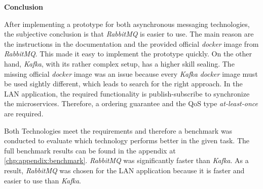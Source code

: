 \textbf{Conclusion}

After implementing a prototype for both asynchronous messaging technologies, the subjective conclusion is that \textit{RabbitMQ} is easier to use.
The main reason are the instructions in the documentation and the provided official \textit{docker} image from \textit{RabbitMQ}.
This made it easy to implement the prototype quickly.
On the other hand, \textit{Kafka}, with its rather complex setup, has a higher skill sealing.
The missing official \textit{docker} image was an issue because every \textit{Kafka} \textit{docker} image must be used sightly different, which leads to search for the right approach.
In the \ac{LAN} application, the required functionality is publish-subscribe to synchronize the microservices.
Therefore, a ordering guarantee and the \ac{QoS} type \textit{at-least-once} are required.

Both Technologies meet the requirements and therefore a benchmark was conducted to evaluate which technology performs better in the given task.
The full benchmark results can be found in the appendix at \ref{chp:appendix:benchmark}.
\textit{RabbitMQ} was significantly faster than \textit{Kafka}.
As a result, \textit{RabbitMQ} was chosen for the \ac{LAN} application because it is faster and easier to use than \textit{Kafka}.
